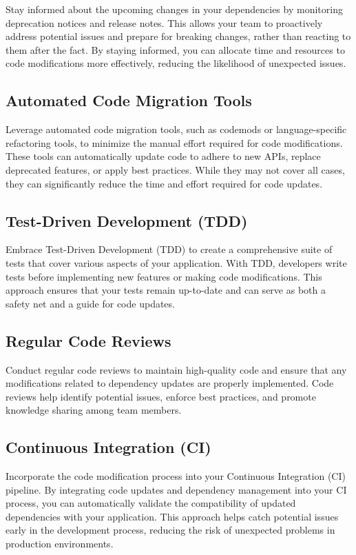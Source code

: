 \documentclass[10pt]{article}
\begin{document}
Stay informed about the upcoming changes in your dependencies by monitoring deprecation notices and release notes. This allows your team to proactively address potential issues and prepare for breaking changes, rather than reacting to them after the fact. By staying informed, you can allocate time and resources to code modifications more effectively, reducing the likelihood of unexpected issues.

\subsection*{Automated Code Migration Tools}

Leverage automated code migration tools, such as codemods or language-specific refactoring tools, to minimize the manual effort required for code modifications. These tools can automatically update code to adhere to new APIs, replace deprecated features, or apply best practices. While they may not cover all cases, they can significantly reduce the time and effort required for code updates.

\subsection*{Test-Driven Development (TDD)}

Embrace Test-Driven Development (TDD) to create a comprehensive suite of tests that cover various aspects of your application. With TDD, developers write tests before implementing new features or making code modifications. This approach ensures that your tests remain up-to-date and can serve as both a safety net and a guide for code updates.

\subsection*{Regular Code Reviews}

Conduct regular code reviews to maintain high-quality code and ensure that any modifications related to dependency updates are properly implemented. Code reviews help identify potential issues, enforce best practices, and promote knowledge sharing among team members.

\subsection*{Continuous Integration (CI)}

Incorporate the code modification process into your Continuous Integration (CI) pipeline. By integrating code updates and dependency management into your CI process, you can automatically validate the compatibility of updated dependencies with your application. This approach helps catch potential issues early in the development process, reducing the risk of unexpected problems in production environments.
\end{document}
